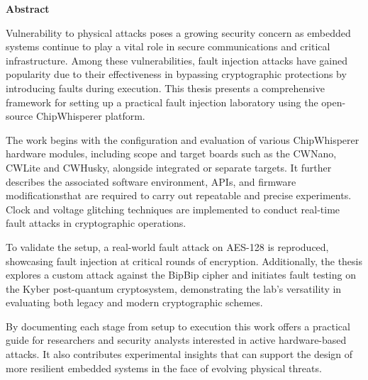 \cleardoublepage
{}
{}
\thispagestyle{empty}
\textbf{\hspace{0pt plus 1filll}\huge Abstract}
\vspace{15mm}

    Vulnerability to physical attacks poses a growing security concern as embedded systems continue to play a vital role in secure communications and critical infrastructure. Among these  vulnerabilities, fault injection attacks have gained popularity due to their effectiveness in bypassing cryptographic protections by introducing faults during execution. This thesis presents a comprehensive framework for setting up a practical fault injection laboratory using the open-source ChipWhisperer platform.
    
    The work begins with the configuration and evaluation of various ChipWhisperer hardware modules, including scope and target boards such as the CWNano, CWLite and CWHusky, alongside integrated or separate targets. It further describes the associated software environment, APIs, and firmware modificationsthat are required to carry out repeatable and precise experiments. Clock and voltage glitching techniques are implemented to conduct real-time fault attacks in cryptographic operations.
    
    To validate the setup, a real-world fault attack on AES-128 is reproduced, showcasing fault injection at critical rounds of encryption. Additionally, the thesis explores a custom attack against the BipBip cipher and initiates fault testing on the Kyber post-quantum cryptosystem, demonstrating the lab's versatility in evaluating both legacy and modern cryptographic schemes.
    
    By documenting each stage from setup to execution this work offers a practical guide for researchers and security analysts interested in active hardware-based attacks. It also contributes experimental insights that can support the design of more resilient embedded systems in the face of evolving physical threats.
    
